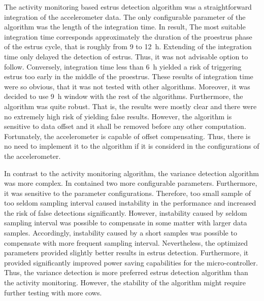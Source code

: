 \documentclass[english,12pt,a4paper,pdftex,elec,utf8]{aaltothesis}
\begin{document}
The activity monitoring based estrus detection algorithm was a straightforward integration of the accelerometer data. The only configurable parameter of the algorithm was the length of the integration time. In result, The most suitable integration time corresponds approximately the duration of the proestrus phase of the estrus cycle, that is roughly from 9 to \SI{12}{\hour}. Extending of the integration time only delayed the detection of estrus. Thus, it was not advisable option to follow. Conversely, integration time less than \SI{6}{\hour} yielded a risk of triggering estrus too early in the middle of the proestrus. These results of integration time were so obvious, that it was not tested with other algorithms. Moreover, it was decided to use \SI{9}{\hour} window with the rest of the algorithms. Furthermore, the algorithm was quite robust. That is, the results were mostly clear and there were no extremely high risk of yielding false results. However, the algorithm is sensitive to data offset and it shall be removed before any other computation. Fortunately, the accelerometer is capable of offset compensating. Thus, there is no need to implement it to the algorithm if it is considerd in the configurations of the accelerometer.

In contrast to the activity monitoring algorithm, the variance detection algorithm was more complex. In contained two more configurable parameters. Furthermore, it was sensitive to the parameter configurations. Therefore, too small sample of too seldom sampling interval caused instability in the performance and increased the risk of false detections significantly. However, instability caused by seldom sampling interval was  possible to compensate in some matter with larger data samples. Accordingly, instability caused by a short samples was possible to compensate with more frequent sampling interval. Nevertheless, the optimized parameters provided slightly better results in estrus detection. Furthermore, it provided significantly improved power saving capabilities for the micro-controller. Thus, the variance detection is more preferred estrus detection algorithm than the activity monitoring. However, the stability of the algorithm might require further testing with more cows.
\end{document}
